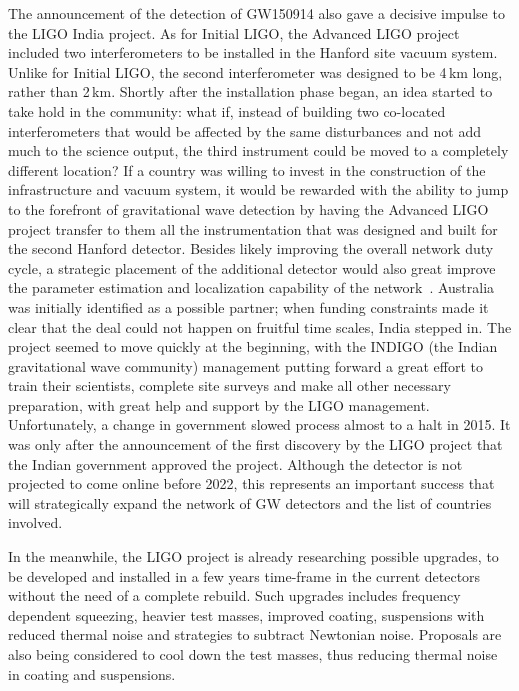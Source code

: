 The announcement of the detection of GW150914 also gave a decisive impulse to the LIGO India project. As for Initial LIGO, the Advanced LIGO project included two interferometers to be installed in the Hanford site vacuum system. Unlike for Initial LIGO, the second interferometer was designed to be 4\,km long, rather than 2\,km. 
Shortly after the installation phase began, an idea started to take hold in the community: what if, instead of building two co-located interferometers that would be affected by the same disturbances and not add much to the science output, the third instrument could be moved to a completely different location? 
If a country was willing to invest in the construction of the infrastructure and vacuum system, it would be rewarded with the ability to jump to the forefront of gravitational wave detection by having the Advanced LIGO project transfer to them all the instrumentation that was designed and built for the second Hanford detector. 
Besides likely improving the overall network duty cycle, a strategic placement of the additional detector would also great improve the parameter estimation and localization capability of the network~\cite{Klimenko_2016}.
Australia was initially identified as a possible partner; when funding constraints made it clear that the deal could not happen on fruitful time scales, India stepped in. 
The project seemed to move quickly at the beginning, with the INDIGO (the Indian gravitational wave community) management putting forward a great effort to train their scientists, complete site surveys and make all other necessary preparation, with great help and support by the LIGO management. 
Unfortunately, a change in government slowed process almost to a halt in 2015. 
It was only after the announcement of the first discovery by the LIGO project that the Indian government approved the project. 
Although the detector is not projected to come online before 2022, this represents an important success that will strategically expand the network of GW detectors and the list of countries involved.

In the meanwhile, the LIGO project is already researching possible upgrades, to be developed and installed in a few years time-frame in the current detectors without the need of a complete rebuild. Such upgrades includes frequency dependent squeezing, heavier test masses, improved coating, suspensions with reduced thermal noise and strategies to subtract Newtonian noise. Proposals are also being considered to cool down the test masses, thus reducing thermal noise in coating and suspensions. 

